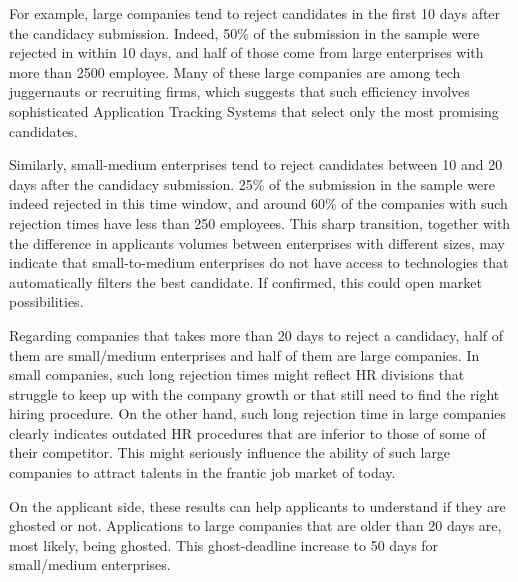 \documentclass[12pt]{article}
\begin{document}
For example, large companies tend to reject candidates in the first 10 days after the candidacy submission. Indeed, 50\% of the submission in the sample were rejected in within 10 days, and half of those come from large enterprises with more than 2500 employee. Many of these large companies are among tech juggernauts or recruiting firms, which suggests that such efficiency involves sophisticated Application Tracking Systems  that select only the most promising candidates. 

Similarly, small-medium enterprises tend to reject candidates between 10 and 20 days after the candidacy submission. 25\% of the submission in the sample were indeed rejected in this time window, and around 60\% of the companies with such rejection times have less than 250 employees. This sharp transition, together with the difference in applicants volumes between enterprises with different sizes, may indicate that small-to-medium enterprises do not have access to technologies that automatically filters the best candidate. If confirmed, this could open market possibilities.

Regarding companies that takes more than 20 days to reject a candidacy, half of them are small/medium enterprises and half of them are large companies. In small companies, such long rejection times might reflect HR divisions that struggle to keep up with the company growth or that still need to find the right hiring procedure. On the other hand, such long rejection time in large companies clearly indicates outdated HR procedures that are inferior to those of some of their competitor. This might seriously influence the ability of such large companies to attract talents in the frantic job market of today.

On the applicant side, these results can help applicants to understand if they are ghosted or not. Applications to large companies that are older than 20 days are, most likely, being ghosted. This ghost-deadline increase to 50 days for small/medium enterprises.
\end{document}
